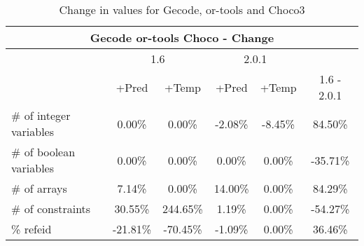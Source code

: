\documentclass{standalone}
\begin{document}
\begin{table}[H]
\footnotesize
\centering
\begin{tabular}{lc|c|c|c|c}
\multicolumn{6}{c}{Gecode or-tools Choco - Change} \\ 
\hline\hline  & \multicolumn{2}{c|}{1.6} &\multicolumn{2}{c|}{2.0.1} &\\ 
\hline  & +Pred & +Temp & +Pred & +Temp & 1.6 - 2.0.1\\
\# of integer variables & 0.00\% & 0.00\% & -2.08\% & -8.45\% & 84.50\% \\ 
\# of boolean variables & 0.00\% & 0.00\% & 0.00\% & 0.00\% & -35.71\% \\ 
\# of arrays            & 7.14\% & 0.00\% & 14.00\% & 0.00\% & 84.29\% \\
\# of constraints       & 30.55\% & 244.65\% & 1.19\% & 0.00\% & -54.27\% \\ 
\% refeid               & -21.81\% & -70.45\% & -1.09\% & 0.00\% & 36.46\%\\ 
\end{tabular}\caption{Change in values for Gecode, or-tools and Choco3}
\end{table}
\end{document}
